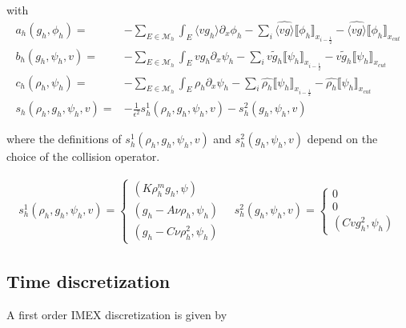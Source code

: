 \documentclass[]{article}
\begin{document}
with
\begin{subequations}
\begin{align}
a_h(g_h, \phi_h) = & - \sum_{E \in \mathcal{M}_h} \int_{E} \langle v g_h \rangle \partial_x \phi_h - \sum_{i} \widehat{\langle v g \rangle} \llbracket \phi_h \rrbracket_{x_{i - \frac{1}{2}}} - \widehat{\langle v g \rangle} \llbracket \phi_h \rrbracket_{x_{cut}}\\
b_h(g_h, \psi_h, v) = & - \sum_{E \in \mathcal{M}_h} \int_{E} v g_h \partial_x \psi_h - \sum_i \widetilde{v g_h} \llbracket \psi_h \rrbracket_{x_{i - \frac{1}{2}}} - \widetilde{v g_h} \llbracket \psi_h \rrbracket_{x_{cut}}\\
c_h(\rho_h, \psi_h) = & - \sum_{E \in \mathcal{M}_h}\int_{E} \rho_h \partial_x \psi_h - \sum_i \widehat{ \rho_h} \llbracket \psi_h \rrbracket_{x_{i - \frac{1}{2}}} - \widehat{ \rho_h} \llbracket \psi_h \rrbracket_{x_{cut}}\\
s_h(\rho_h, g_h, \psi_h, v) = & - \frac{1}{\epsilon^2}s_h^1(\rho_h, g_h, \psi_h, v) - s_h^2(g_h, \psi_h, v)
\end{align}
\end{subequations}

where the definitions of $s_h^1(\rho_h, g_h, \psi_h, v)$ and $s_h^2(g_h, \psi_h, v)$ depend on the choice of the collision operator.

	\begin{align*}
		s_h^1(\rho_h, g_h, \psi_h, v) = \begin{cases}
			(K \rho_h^m g_h, \psi) \\
			(g_h - A \nu \rho_h, \psi_h) \\
			(g_h - C \nu \rho_h^2, \psi_h)
		\end{cases}
		\quad
		s_h^2(g_h, \psi_h, v) = \begin{cases}
			0 \\
			0 \\
			(C v g_h^2, \psi_h)
		\end{cases}
	\end{align*}

\subsection{Time discretization}

A first order IMEX discretization is given by
\end{document}
